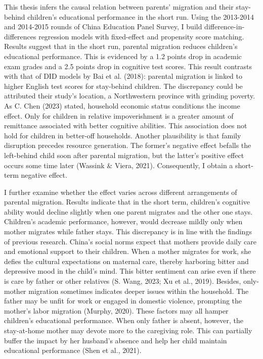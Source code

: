 \documentclass[
  man,floatsintext]{apa7}
\begin{document}
This thesis infers the causal relation between parents' migration and their stay-behind children's educational performance in the short run. Using the 2013-2014 and 2014-2015 rounds of China Education Panel Survey, I build difference-in-differences regression models with fixed-effect and propensity score matching. Results suggest that in the short run, parental migration reduces children's educational performance. This is evidenced by a 1.2 points drop in academic exam grades and a 2.5 points drop in cognitive test scores. This result contrasts with that of DID models by Bai et al. (2018): parental migration is linked to higher English test scores for stay-behind children. The discrepancy could be attributed their study's location, a Northwestern province with grinding poverty. As C. Chen (2023) stated, household economic status conditions the income effect. Only for children in relative impoverishment is a greater amount of remittance associated with better cognitive abilities. This association does not hold for children in better-off households. Another plausibility is that family disruption precedes resource generation. The former's negative effect befalls the left-behind child soon after parental migration, but the latter's positive effect occurs some time later (Wassink \& Viera, 2021). Consequently, I obtain a short-term negative effect.

I further examine whether the effect varies across different arrangements of parental migration. Results indicate that in the short term, children's cognitive ability would decline slightly when one parent migrates and the other one stays. Children's academic performance, however, would decrease mildly only when mother migrates while father stays. This discrepancy is in line with the findings of previous research. China's social norms expect that mothers provide daily care and emotional support to their children. When a mother migrates for work, she defies the cultural expectations on maternal care, thereby harboring bitter and depressive mood in the child's mind. This bitter sentiment can arise even if there is care by father or other relatives (S. Wang, 2023; Xu et al., 2019). Besides, only-mother migration sometimes indicates deeper issues within the household. The father may be unfit for work or engaged in domestic violence, prompting the mother's labor migration (Murphy, 2020). These factors may all hamper children's educational performance. When only father is absent, however, the stay-at-home mother may devote more to the caregiving role. This can partially buffer the impact by her husband's absence and help her child maintain educational performance (Shen et al., 2021).
\end{document}
